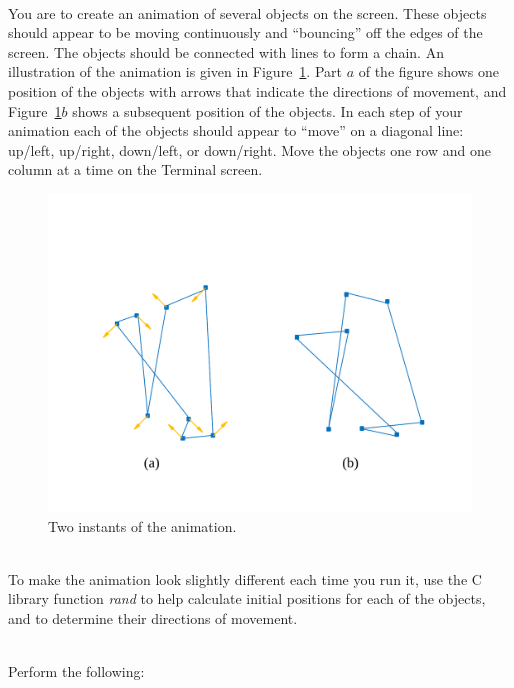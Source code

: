 \documentclass[epsfig,10pt,fullpage]{article}
\begin{document}
~\\
\noindent
You are to create an animation of several objects on the screen. These objects should appear 
to be moving continuously and ``bouncing'' off the edges of the screen. The objects should 
be connected with lines to form a chain. An illustration of the animation is given in 
Figure~\ref{fig:animation_example}. Part $a$ of the figure shows one position
of the objects with arrows that indicate the directions of movement, and 
Figure~\ref{fig:animation_example}$b$ shows a subsequent position of the objects. 
In each step of your animation each of the objects should appear to ``move'' on a diagonal 
line: up/left, up/right, down/left, or down/right. Move the objects one row and one column 
at a time on the Terminal screen.

\begin{figure}[h!]
   \begin{center}
       \includegraphics[scale = 0.5]{figures/fig_animation_example.pdf}
   \end{center}
   \caption{Two instants of the animation.}
    \label{fig:animation_example}
\end{figure}

~\\
\noindent
To make the animation look slightly different each time you run it, use the C library function 
{\it rand} to help calculate initial positions for each of the objects, and to determine 
their directions of movement. 

~\\
\noindent
Perform the following:
\end{document}
